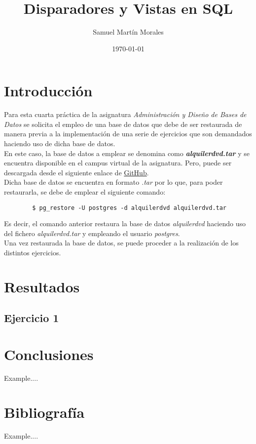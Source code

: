 \documentclass{report}
\begin{document}
	
	
	\title{Disparadores y Vistas en SQL}
	\author{Samuel Martín Morales}
	\date{\today}
	
	\maketitle
	
	\tableofcontents
	
	\chapter{Introducción}
  Para esta cuarta práctica de la asignatura \emph{Administración y Diseño de Bases de Datos} se solicita el empleo de una base de datos que debe de ser restaurada de manera previa a la implementación de una serie de ejercicios que son demandados haciendo uso de dicha base de datos.\\

	En este caso, la base de datos a emplear se denomina como \emph{\textbf{alquilerdvd.tar}} y se encuentra disponible en el campus virtual de la asignatura. Pero, puede ser descargada desde el siguiente enlace de \href{https://github.com/Samuelmm15/PostgreSQL-Rent/blob/main/AlquilerPractica.tar}{GitHub}.\\

	Dicha base de datos se encuentra en formato \emph{.tar} por lo que, para poder restaurarla, se debe de emplear el siguiente comando:

	\begin{verbatim}
		$ pg_restore -U postgres -d alquilerdvd alquilerdvd.tar
	\end{verbatim}

	Es decir, el comando anterior restaura la base de datos \emph{alquilerdvd} haciendo uso del fichero \emph{alquilerdvd.tar} y empleando el usuario \emph{postgres}.\\

	Una vez restaurada la base de datos, se puede proceder a la realización de los distintos ejercicios.\\

	\chapter{Resultados}
	\section{Ejercicio 1}
	
	
	\chapter{Conclusiones}
  Example....	

	\chapter{Bibliografía}
	Example....
	
\end{document}
